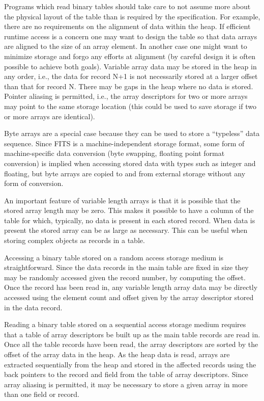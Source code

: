 Programs which read binary tables should take care to not assume more
about the physical layout of the table than is required by the
specification.  For example, there are no requirements on the
alignment of data within the heap.  If efficient runtime access is a
concern one may want to design the table so that data arrays are
aligned to the size of an array element.  In another case one might
want to minimize storage and forgo any efforts at alignment (by
careful design it is often possible to achieve both goals).  Variable
array data may be stored in the heap in any order, i.e., the data for
record N+1 is not necessarily stored at a larger offset than that for
record N.  There may be gaps in the heap where no data is stored.
Pointer aliasing is permitted, i.e., the array descriptors for two or
more arrays may point to the same storage location (this could be used
to save storage if two or more arrays are identical).

Byte arrays are a special case because they can be used to store a
``typeless'' data sequence.  Since FITS is a machine-independent
storage format, some form of machine-specific data conversion (byte
swapping, floating point format conversion) is implied when accessing
stored data with types such as integer and floating, but byte arrays
are copied to and from external storage without any form of
conversion.

An important feature of variable length arrays is that it is possible
that the stored array length may be zero.  This makes it possible to
have a column of the table for which, typically, no data is present in
each stored record.  When data is present the stored array can be as
large as necessary.  This can be useful when storing complex objects
as records in a table.

Accessing a binary table stored on a random access storage medium is
straightforward.  Since the data records in the main table are fixed
in size they may be randomly accessed given the record number, by
computing the offset.  Once the record has been read in, any variable
length array data may be directly accessed using the element count and
offset given by the array descriptor stored in the data record.

Reading a binary table stored on a sequential access storage medium
requires that a table of array descriptors be built up as the main
table records are read in.  Once all the table records have been read,
the array descriptors are sorted by the offset of the array data in
the heap.  As the heap data is read, arrays are extracted sequentially
from the heap and stored in the affected records using the back
pointers to the record and field from the table of array descriptors.
Since array aliasing is permitted, it may be necessary to store a
given array in more than one field or record.

